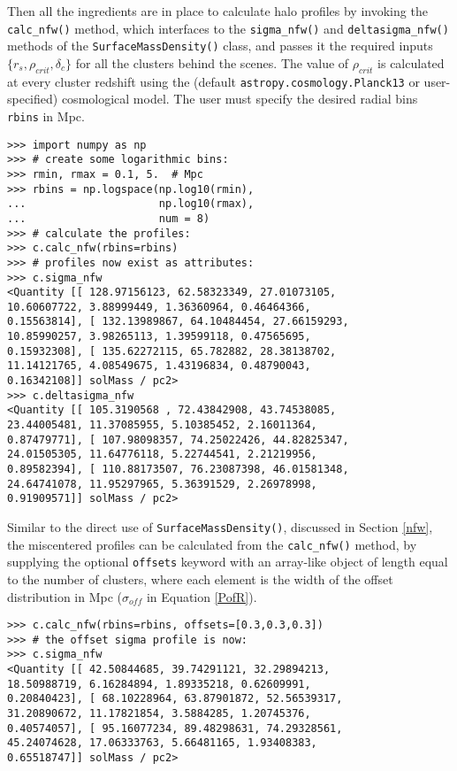 \documentclass[twocolumn]{aastex6}
\newcommand{\code}{\lstinline[style=codeintext]}
\begin{document}
Then all the ingredients are in place to calculate halo profiles by invoking the \code{calc_nfw()} method, which interfaces to the \code{sigma_nfw()} and \code{deltasigma_nfw()} methods of the \code{SurfaceMassDensity()} class, and passes it the required inputs $\{ r_s, \rho_{crit}, \delta_c \}$ for all the clusters behind the scenes. The value of $\rho_{crit}$ is calculated at every cluster redshift using the (default \code{astropy.cosmology.Planck13} or user-specified) cosmological model. The user must specify the desired radial bins \code{rbins} in Mpc.
\begin{verbatim}
>>> import numpy as np
>>> # create some logarithmic bins:
>>> rmin, rmax = 0.1, 5.  # Mpc
>>> rbins = np.logspace(np.log10(rmin),
...                     np.log10(rmax),
...                     num = 8)
>>> # calculate the profiles:
>>> c.calc_nfw(rbins=rbins)
>>> # profiles now exist as attributes:
>>> c.sigma_nfw
<Quantity [[ 128.97156123, 62.58323349, 27.01073105, 
10.60607722, 3.88999449, 1.36360964, 0.46464366, 
0.15563814], [ 132.13989867, 64.10484454, 27.66159293,
10.85990257, 3.98265113, 1.39599118, 0.47565695, 
0.15932308], [ 135.62272115, 65.782882, 28.38138702, 
11.14121765, 4.08549675, 1.43196834, 0.48790043, 
0.16342108]] solMass / pc2>
>>> c.deltasigma_nfw
<Quantity [[ 105.3190568 , 72.43842908, 43.74538085, 
23.44005481, 11.37085955, 5.10385452, 2.16011364, 
0.87479771], [ 107.98098357, 74.25022426, 44.82825347,
24.01505305, 11.64776118, 5.22744541, 2.21219956, 
0.89582394], [ 110.88173507, 76.23087398, 46.01581348, 
24.64741078, 11.95297965, 5.36391529, 2.26978998,
0.91909571]] solMass / pc2>
\end{verbatim}

Similar to the direct use of \code{SurfaceMassDensity()}, discussed in Section \ref{nfw}, the miscentered profiles can be calculated from the \code{calc_nfw()} method, by supplying the optional \code{offsets} keyword with an array-like object of length equal to the number of clusters, where each element is the width of the offset distribution in Mpc ($\sigma_{off}$ in Equation \ref{PofR}).
\begin{verbatim}
>>> c.calc_nfw(rbins=rbins, offsets=[0.3,0.3,0.3])
>>> # the offset sigma profile is now:
>>> c.sigma_nfw
<Quantity [[ 42.50844685, 39.74291121, 32.29894213, 
18.50988719, 6.16284894, 1.89335218, 0.62609991, 
0.20840423], [ 68.10228964, 63.87901872, 52.56539317,
31.20890672, 11.17821854, 3.5884285, 1.20745376, 
0.40574057], [ 95.16077234, 89.48298631, 74.29328561, 
45.24074628, 17.06333763, 5.66481165, 1.93408383,
0.65518747]] solMass / pc2>
\end{verbatim}
\end{document}
